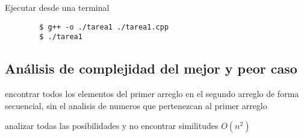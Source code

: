 \documentclass{article}
\begin{document}
Ejecutar desde una terminal

\begin{commandline}
	\begin{verbatim}
		$ g++ -o ./tarea1 ./tarea1.cpp
		$ ./tarea1
	\end{verbatim}
\end{commandline}



\newpage
\subsection{Análisis de complejidad del mejor y peor caso}
\begin{warn}
  encontrar todos los elementos del primer arreglo en el segundo arreglo de forma secuencial, sin el analisis de numeros que pertenezcan al primer arreglo
\end{warn}
\begin{warn}
  analizar todas las posibilidades y no encontrar similitudes $O(n^{2})$
\end{warn}
\end{document}
